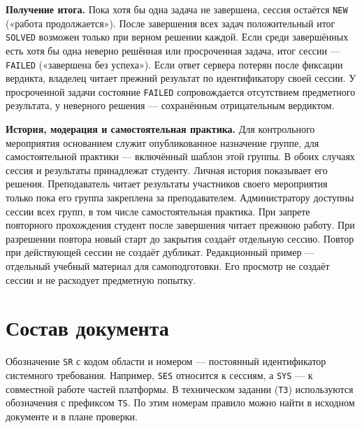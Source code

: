 \documentclass[12pt,a4paper]{article}
\begin{document}
\textbf{Получение итога.} Пока хотя бы одна задача не завершена, сессия остаётся \texttt{NEW} («работа продолжается»). После завершения всех задач положительный итог \texttt{SOLVED} возможен только при верном решении каждой. Если среди завершённых есть хотя бы одна неверно решённая или просроченная задача, итог сессии --- \texttt{FAILED} («завершена без успеха»). Если ответ сервера потерян после фиксации вердикта, владелец читает прежний результат по идентификатору своей сессии. У просроченной задачи состояние \texttt{FAILED} сопровождается отсутствием предметного результата, у неверного решения --- сохранённым отрицательным вердиктом.

\textbf{История, модерация и самостоятельная практика.} Для контрольного мероприятия основанием служит опубликованное назначение группе, для самостоятельной практики --- включённый шаблон этой группы. В обоих случаях сессия и результаты принадлежат студенту. Личная история показывает его решения. Преподаватель читает результаты участников своего мероприятия только пока его группа закреплена за преподавателем. Администратору доступны сессии всех групп, в том числе самостоятельная практика. При запрете повторного прохождения студент после завершения читает прежнюю работу. При разрешении повтора новый старт до закрытия создаёт отдельную сессию. Повтор при действующей сессии не создаёт дубликат. Редакционный пример --- отдельный учебный материал для самоподготовки. Его просмотр не создаёт сессии и не расходует предметную попытку.

\section{Состав документа}\label{3-ux441ux43eux441ux442ux430ux432-ux434ux43eux43aux443ux43cux435ux43dux442ux430}

\hypertarget{3-состав-документа}{}

Обозначение \texttt{SR} с кодом области и номером --- постоянный идентификатор системного требования. Например, \texttt{SES} относится к сессиям, а \texttt{SYS} --- к совместной работе частей платформы. В техническом задании (\texttt{ТЗ}) используются обозначения с префиксом \texttt{TS}. По этим номерам правило можно найти в исходном документе и в плане проверки.
\end{document}
